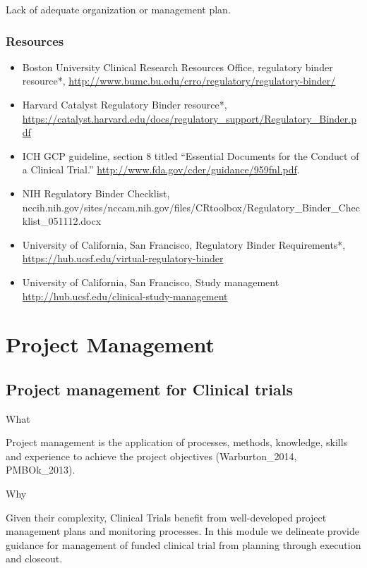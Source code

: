 \documentclass[]{book}
\providecommand{\tightlist}{%
  \setlength{\itemsep}{0pt}\setlength{\parskip}{0pt}}
\begin{document}
Lack of adequate organization or management plan.

\subsection{Resources}\label{resources-16}

\begin{itemize}
\tightlist
\item
  Boston University Clinical Research Resources Office, regulatory
  binder resource*,
  \url{http://www.bumc.bu.edu/crro/regulatory/regulatory-binder/}
\item
  Harvard Catalyst Regulatory Binder resource*,
  \url{https://catalyst.harvard.edu/docs/regulatory_support/Regulatory_Binder.pdf}
\item
  ICH GCP guideline, section 8 titled ``Essential Documents for the
  Conduct of a Clinical Trial.''
  \url{http://www.fda.gov/cder/guidance/959fnl.pdf}.
\item
  NIH Regulatory Binder Checklist,
  nccih.nih.gov/sites/nccam.nih.gov/files/CRtoolbox/Regulatory\_Binder\_Checklist\_051112.docx
\item
  University of California, San Francisco, Regulatory Binder
  Requirements*, \url{https://hub.ucsf.edu/virtual-regulatory-binder}
\item
  University of California, San Francisco, Study management
  \url{http://hub.ucsf.edu/clinical-study-management}
\end{itemize}

\chapter{Project Management}\label{project-management}

\section{Project management for Clinical
trials}\label{project-management-for-clinical-trials}

What

Project management is the application of processes, methods, knowledge,
skills and experience to achieve the project objectives
(Warburton\_2014, PMBOk\_2013).

Why

Given their complexity, Clinical Trials benefit from well-developed
project management plans and monitoring processes. In this module we
delineate provide guidance for management of funded clinical trial from
planning through execution and closeout.
\end{document}

